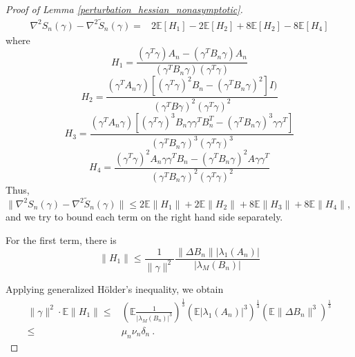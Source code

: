 \documentclass{article} \usepackage{iclr2019_conference,times}
\newcommand{\expe}{\mathbb{E}}
\begin{document}
\begin{proof}[Proof of Lemma \ref{perturbation_hessian_nonasymptotic}]
\begin{equation}
    \begin{split}
        \nabla^2 S_n(\gamma) - \nabla^2 \tilde{S}_n(\gamma) =&
        2 \expe [H_1] - 2 \expe [H_2] + 8 \expe [H_2] - 8 \expe [H_4]
    \end{split}
\end{equation}
where
\begin{equation}
    H_1 = \frac{(\gamma^T \gamma) A_n - (\gamma^T B_n \gamma) A_n}{(\gamma^T B_n \gamma)(\gamma^T \gamma)}
\end{equation}
\begin{equation}
    H_2 = \frac{(\gamma^T A_n \gamma) [(\gamma^T \gamma)^2 B_n - (\gamma^T B_n \gamma)^2] I)}{(\gamma^T B \gamma)^2 (\gamma^T \gamma)^2}
\end{equation}
\begin{equation}
    H_3 = \frac{(\gamma^T A_n \gamma) [(\gamma^T \gamma)^3 B_n \gamma \gamma^T B_n^T - (\gamma^T B_n \gamma)^3 \gamma \gamma^T]}{(\gamma^T B_n \gamma)^3 (\gamma^T \gamma)^3}
\end{equation}
\begin{equation}
    H_4 = \frac{(\gamma^T \gamma)^2 A_n \gamma \gamma^T B_n - (\gamma^T B_n \gamma)^2 A \gamma \gamma^T}{(\gamma^T B_n \gamma)^2 (\gamma^T \gamma)^2}
\end{equation}
Thus, $\|\nabla^2 S_n(\gamma) - \nabla^2 \tilde{S}_n(\gamma) \| \leq 2 \expe \|H_1\| + 2 \expe \|H_2\| + 8 \expe \|H_3\| + 8 \expe \|H_4\|$, and we try to bound each term on the right hand side separately.

For the first term, there is
\begin{equation}
    \| H_1 \| \leq \frac{1}{\| \gamma \|^2} \frac{\| \Delta B_n \| |\lambda_1(A_n)|}{|\lambda_M(B_n)|}
\end{equation}

Applying generalized H{\"o}lder's inequality, we obtain
\begin{equation}
    \begin{split}
        \|\gamma\|^2 \cdot \expe \| H_1\| \leq &  \left(\expe \frac{1}{|\lambda_M(B_n)|^3}\right)^\frac{1}{3} (\expe |\lambda_1(A_n)|^3)^\frac{1}{3} (\expe \| \Delta B_n \|^3)^\frac{1}{3} \\
        \leq & \mu_n \nu_n \delta_n~.
    \end{split}
\end{equation}


\end{proof}
\end{document}
